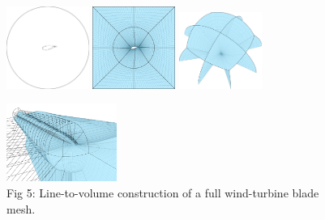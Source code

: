 \documentclass[landscape]{sintefposter}
\begin{document}
\begin{multicols}{3}
\begin{figure}[ht]
  \begin{center}
    \includegraphics[width=0.24\textwidth]{Figures/tfi-1}
    \includegraphics[width=0.24\textwidth]{Figures/tfi-4}
    \includegraphics[width=0.24\textwidth]{Figures/wingtip-flower} \\
  \end{center}
\end{figure}
\begin{figure}[ht]
  \begin{center}
    \includegraphics[width=0.32\textwidth]{Figures/block-2} \\
    \small{
      Fig 5: Line-to-volume construction of a full wind-turbine blade mesh.
    }
  \end{center}
\end{figure}


\end{multicols}
\end{document}
